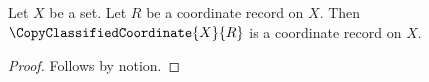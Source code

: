 

\begin{proposition}\label{classified_copy_requires_exactness}
    Let $X$ be a set.
    Let $R$ be a coordinate record on $X$.
    Then $\CopyClassifiedCoordinate{X}{R}$ is a coordinate record on $X$.
\end{proposition}
\begin{proof}
    Follows by notion.
\end{proof}
